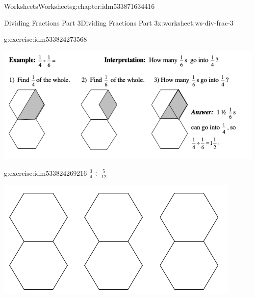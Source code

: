 \documentclass[twoside,11pt,]{book}
\begin{document}
\begin{chapterptx}{Worksheets}{}{Worksheets}{}{}{g:chapter:idm533871634416}
\begin{worksheet-section-numberless}{Dividing Fractions Part 3}{}{Dividing Fractions Part 3}{}{}{x:worksheet:ws-div-frac-3}
\begin{divisionexercise}{2}{}{}{g:exercise:idm533824273568}
\begin{sidebyside}{1}{0.15}{0.15}{0}
\begin{sbspanel}{0.7}
\end{sbspanel}%
\end{sidebyside}%
\end{divisionexercise}%
\clearpage
\begin{introduction}{}%
\begin{sidebyside}{1}{0}{0}{0}%
\begin{sbspanel}{1}%
\includegraphics[width=1\linewidth]{images/frac-div-hex-3.png}
\end{sbspanel}%
\end{sidebyside}%
\end{introduction}%
\begin{divisionexercise}{3}{}{}{g:exercise:idm533824269216}%
\(\frac{3}{4} \div \frac{5}{12} \)%
\begin{sidebyside}{1}{0.15}{0.15}{0}%
\begin{sbspanel}{0.7}%
\includegraphics[width=1\linewidth]{images/3-double-hexagons.png}
\end{sbspanel}%
\end{sidebyside}%
\end{divisionexercise}%
\end{worksheet-section-numberless}
\restoregeometry
%
%
\typeout{************************************************}
\typeout{************************************************}

\end{chapterptx}
\end{document}
